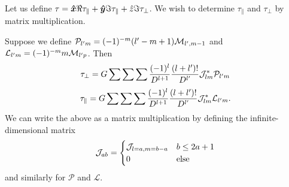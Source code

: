 \documentclass[aps,twocolumn,secnumarabic,balancelastpage,amsmath,amssymb,nofootinbib,floatfix]{revtex4-1}
\begin{document}
Let us define $\tau = \bm{\hat x} \Re\tau_{\parallel} + \bm{\hat y} \Im \tau_{\parallel} + \hat z \Im\tau_\perp$. We wish to determine $\tau_\parallel$ and $\tau_\perp$ by matrix multiplication.

Suppose we define $\mathcal{P}_{l'm} = (-1)^{-m}(l' - m + 1) \mathcal{M}_{l',m-1}$ and
$\mathcal{L}_{l'm}=(-1)^{-m}m\mathcal{M}_{l'p}$. Then
$$\tau_\perp =G\sum \sum \sum \frac{(-1)^l}{D^{l+1}} \frac{(l+l')!}{D^{l'}}\mathcal{J}_{lm}^*\mathcal{P}_{l'm}$$
$$\tau_\parallel =G\sum \sum \sum \frac{(-1)^l}{D^{l+1}} \frac{(l+l')!}{D^{l'}}\mathcal{J}_{lm}^*\mathcal{L}_{l'm}.$$
We can write the above as a matrix multiplication by defining the infinite-dimensional matrix
$$\mathcal{J}_{ab} = \begin{cases}
    \mathcal{J}_{l=a,m=b-a} & b \leq 2a+1 \\
    0 & \text{else}
\end{cases}$$
and similarly for $\mathcal{P}$ and $\mathcal{L}$.



\end{document}
